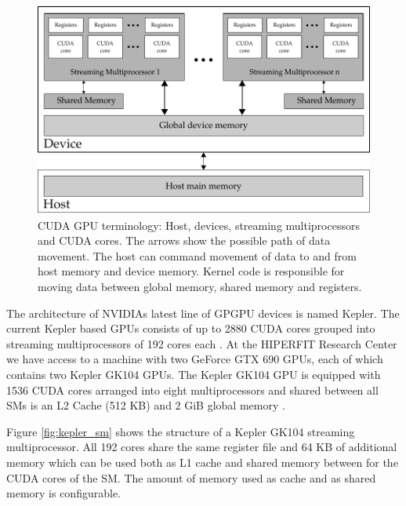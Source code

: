 \begin{figure}
  \centering
  \includegraphics[width=\textwidth]{graphics/cuda-structure}
  \caption{CUDA GPU terminology: Host, devices, streaming
    multiprocessors and CUDA cores. The arrows show the possible path
    of data movement. The host can command movement of data to and
    from host memory and device memory. Kernel code is responsible for
    moving data between global memory, shared memory and registers.}
  \label{fig:gpu_terminology}
\end{figure}

The architecture of NVIDIAs latest line of GPGPU devices is named
Kepler. The current Kepler based GPUs consists of up to 2880 CUDA
cores grouped into streaming multiprocessors of 192 cores each
\cite{nvidia2012keplerGK110}. At the HIPERFIT Research Center we have
access to a machine with two GeForce GTX 690 GPUs, each of which
contains two Kepler GK104 GPUs. The Kepler GK104 GPU is equipped with
1536 CUDA cores arranged into eight multiprocessors and shared between
all SMs is an L2 Cache (512 KB) and 2 GiB global memory
\cite{nvidia2012geforcegtx680}.

Figure \ref{fig:kepler_sm} shows the structure of a Kepler GK104
streaming multiprocessor. All 192 cores share the same register file
and 64 KB of additional memory which can be used both as L1 cache and
shared memory between for the CUDA cores of the SM. The amount of
memory used as cache and as shared memory is configurable.

